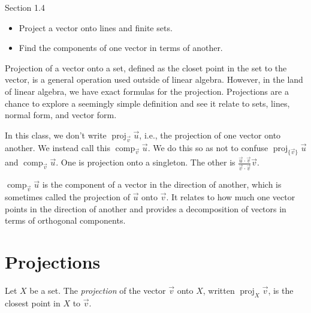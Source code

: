 \documentclass{problemset}
\DeclareMathOperator{\Comp}{comp}
\DeclareMathOperator{\Proj}{proj}
\begin{document}
\begin{lesson}

	Section 1.4

	\begin{itemize}
		\item Project a vector onto lines and finite sets.
		\item Find the components of one vector in terms of another.
	\end{itemize}

	Projection of a vector onto a set, defined as the closet point in the
	set to the vector, is a general operation used outside of linear algebra.
	However, in the land of linear algebra, we have exact formulas for the
	projection. Projections are a chance to explore a seemingly simple definition
	and see it relate to sets, lines, normal form, and vector form.

	\begin{annotation}
		\begin{notes}
			In this class, we don't write $\Proj_{\vec v}\vec u$,
			i.e., the projection of one vector onto another. We
			instead call this $\Comp_{\vec v}\vec u$. We do this so
			as not to confuse $\Proj_{\{\vec v\}}\vec u$ and
			$\Comp_{\vec v}\vec u$. One is projection onto a singleton.
			The other is $\frac{\vec u\cdot \vec v}{\vec v\cdot \vec v}\vec v$.
		\end{notes}
	\end{annotation}
	$\Comp_{\vec v}\vec u$ is the component of a vector in the direction of another,
	which is sometimes called the projection of $\vec u$ onto $\vec v$. It relates
	to how much one vector points in the direction of another and
	provides a decomposition of vectors in terms of orthogonal components.


\end{lesson}
\section*{Projections}

	\begin{definition}[Projection]
		Let $X$ be a set. The \emph{projection} of the vector $\vec v$
		onto $X$, written $\Proj_X\vec v$, is the closest point in $X$ to $\vec v$.
	\end{definition}
\end{document}
